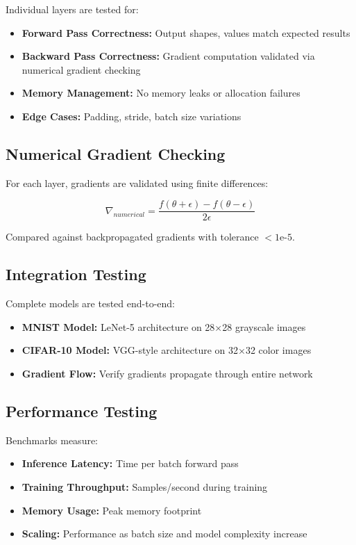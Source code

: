 \documentclass[12pt,oneside,a4paper]{report}
\begin{document}
Individual layers are tested for:
\begin{itemize}
    \item \textbf{Forward Pass Correctness:} Output shapes, values match expected results
    \item \textbf{Backward Pass Correctness:} Gradient computation validated via numerical gradient checking
    \item \textbf{Memory Management:} No memory leaks or allocation failures
    \item \textbf{Edge Cases:} Padding, stride, batch size variations
\end{itemize}

\subsection{Numerical Gradient Checking}

For each layer, gradients are validated using finite differences:

$$\nabla_{numerical} = \frac{f(\theta + \epsilon) - f(\theta - \epsilon)}{2\epsilon}$$

Compared against backpropagated gradients with tolerance $< 1\text{e-5}$.

\subsection{Integration Testing}

Complete models are tested end-to-end:
\begin{itemize}
    \item \textbf{MNIST Model:} LeNet-5 architecture on 28×28 grayscale images
    \item \textbf{CIFAR-10 Model:} VGG-style architecture on 32×32 color images
    \item \textbf{Gradient Flow:} Verify gradients propagate through entire network
\end{itemize}

\subsection{Performance Testing}

Benchmarks measure:
\begin{itemize}
    \item \textbf{Inference Latency:} Time per batch forward pass
    \item \textbf{Training Throughput:} Samples/second during training
    \item \textbf{Memory Usage:} Peak memory footprint
    \item \textbf{Scaling:} Performance as batch size and model complexity increase
\end{itemize}
\end{document}
